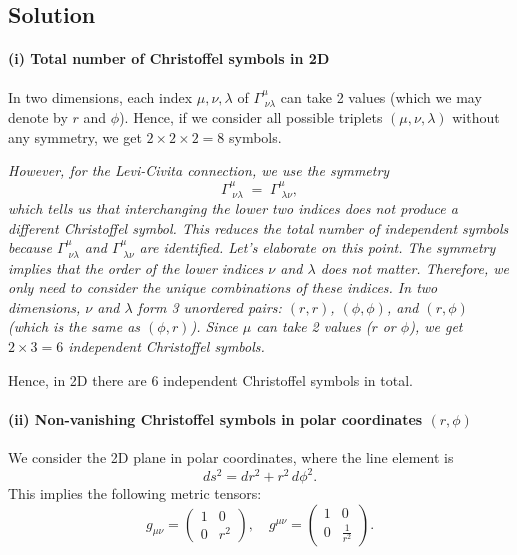\documentclass{article}
\begin{document}
\subsection*{Solution}

\paragraph{(i) Total number of Christoffel symbols in 2D}
In two dimensions, each index \(\mu, \nu, \lambda\) of \(\Gamma^\mu_{\;\nu\lambda}\) can take 2 values (which we may denote by \(r\) and \(\phi\)). Hence, if we consider all possible triplets \((\mu,\nu,\lambda)\) without any symmetry, we get \(2 \times 2 \times 2 = 8\) symbols.

\emph{However, for the Levi-Civita connection, we use the symmetry
\[
\Gamma^\mu_{\;\nu\lambda} \;=\; \Gamma^\mu_{\;\lambda\nu},
\]
which tells us that interchanging the lower two indices does not produce a different Christoffel symbol. This reduces the total number of \emph{independent} symbols because \(\Gamma^\mu_{\;\nu\lambda}\) and \(\Gamma^\mu_{\;\lambda\nu}\) are identified. Let's elaborate on this point. The symmetry implies that the order of the lower indices \(\nu\) and \(\lambda\) does not matter. Therefore, we only need to consider the unique combinations of these indices. In two dimensions, \(\nu\) and \(\lambda\) form 3 unordered pairs: \((r,r)\), \((\phi,\phi)\), and \((r,\phi)\) (which is the same as \((\phi, r)\)). Since \(\mu\) can take 2 values (\(r\) or \(\phi\)), we get \(2 \times 3 = 6\) independent Christoffel symbols.}

Hence, in 2D there are \(\boxed{6}\) independent Christoffel symbols in total.

\bigskip

\paragraph{(ii) Non-vanishing Christoffel symbols in polar coordinates \((r,\phi)\)}

We consider the 2D plane in polar coordinates, where the line element is 
\[
ds^2 = dr^2 + r^2\,d\phi^2.
\]
This implies the following metric tensors:
\[
g_{\mu\nu} 
= 
\begin{pmatrix}
1 & 0 \\
0 & r^2
\end{pmatrix},
\quad
g^{\mu\nu} 
= 
\begin{pmatrix}
1 & 0 \\
0 & \frac{1}{r^2}
\end{pmatrix}.
\]
\end{document}
